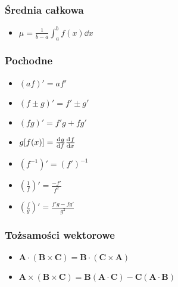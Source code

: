 \documentclass[../main.tex]{subfiles}
\begin{document}
\begin{multicols}{2}
\subsubsection*{Średnia całkowa}
\begin{itemize}
    \item \(\mu=\frac{1}{b-a}\int_a^bf(x)\dd{x}\)
\end{itemize}
\subsubsection*{Pochodne}
\begin{itemize}
    \item \((af)'=af'\)
    \item \((f\pm g)'=f'\pm g'\)
    \item \((fg)'=f'g+fg'\)
    \item \(g[f(x)]=\dv[]{g}{f}\dv[]{f}{x}\)
    \item \((f^{-1})'=(f')^{-1}\)
    \item \((\frac{1}{f})'=\frac{-f'}{f^2}\)
    \item \((\frac{f}{g})'=\frac{f'g-fg'}{g^2}\)
\end{itemize}
\subsubsection*{Tożsamości wektorowe}
\begin{itemize}
    \item \(\mathbf{A}\cdot(\mathbf{B}\times\mathbf{C})=\mathbf{B}\cdot(\mathbf{C}\times\mathbf{A})\)
    \item \(\mathbf{A}\times(\mathbf{B}\times\mathbf{C})=\mathbf{B}(\mathbf{A}\cdot\mathbf{C})-\mathbf{C}(\mathbf{A}\cdot\mathbf{B})\)
\end{itemize}

\end{multicols}
\end{document}
